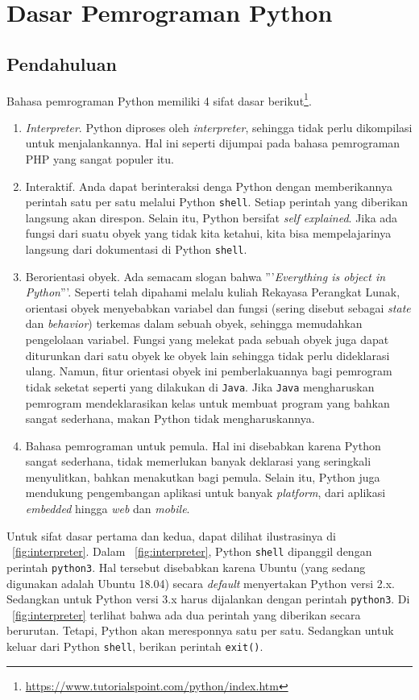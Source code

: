 \chapter{Dasar Pemrograman Python}
\section{Pendahuluan}
Bahasa pemrograman Python memiliki 4 sifat dasar berikut\footnote{\url{https://www.tutorialspoint.com/python/index.htm}}.
\begin{enumerate}
  \item \textit{Interpreter}. Python diproses oleh \textit{interpreter}, sehingga tidak perlu dikompilasi untuk menjalankannya. Hal ini seperti dijumpai pada bahasa pemrograman PHP yang sangat populer itu.
  \item Interaktif. Anda dapat berinteraksi denga Python dengan memberikannya perintah satu per satu melalui Python \texttt{shell}. Setiap perintah yang diberikan langsung akan direspon. Selain itu, Python bersifat \textit{self explained}. Jika ada fungsi dari suatu obyek yang tidak kita ketahui, kita bisa mempelajarinya langsung dari dokumentasi di Python \texttt{shell}.
  \item Berorientasi obyek. Ada semacam slogan bahwa '''\textit{Everything is object in Python}'''. Seperti telah dipahami melalu kuliah Rekayasa Perangkat Lunak, orientasi obyek menyebabkan variabel dan fungsi (sering disebut sebagai \textit{state} dan \textit{behavior}) terkemas dalam sebuah obyek, sehingga memudahkan pengelolaan variabel. Fungsi yang melekat pada sebuah obyek juga dapat diturunkan dari satu obyek ke obyek lain sehingga tidak perlu dideklarasi ulang. Namun, fitur orientasi obyek ini pemberlakuannya bagi pemrogram tidak seketat seperti yang dilakukan di \texttt{Java}. Jika \texttt{Java} mengharuskan pemrogram mendeklarasikan kelas untuk membuat program yang bahkan sangat sederhana, makan Python tidak mengharuskannya.
  \item Bahasa pemrograman untuk pemula. Hal ini disebabkan karena Python sangat sederhana, tidak memerlukan banyak deklarasi yang seringkali menyulitkan, bahkan menakutkan bagi pemula. Selain itu, Python juga mendukung pengembangan aplikasi untuk banyak \textit{platform}, dari aplikasi \textit{embedded} hingga \textit{web} dan \textit{mobile}. 
\end{enumerate}

Untuk sifat dasar pertama dan kedua, dapat dilihat ilustrasinya di \figurename~\ref{fig:interpreter}. Dalam \figurename~\ref{fig:interpreter}, Python \texttt{shell} dipanggil dengan perintah \texttt{python3}. Hal tersebut disebabkan karena Ubuntu (yang sedang digunakan adalah Ubuntu 18.04) secara \textit{default} menyertakan Python versi 2.x. Sedangkan untuk Python versi 3.x harus dijalankan dengan perintah \texttt{python3}. Di \figurename~\ref{fig:interpreter} terlihat bahwa ada dua perintah yang diberikan secara berurutan. Tetapi, Python akan meresponnya satu per satu. Sedangkan untuk keluar dari Python \texttt{shell}, berikan perintah \texttt{exit()}.

